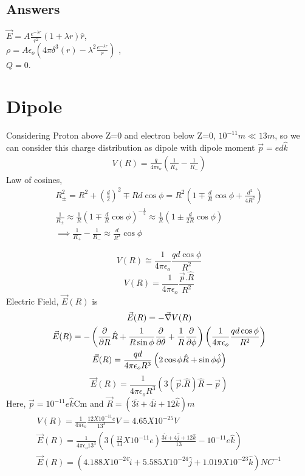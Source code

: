 \documentclass[11pt, a4paper]{article}
\begin{document}
\subsection*{Answers}
\(\boxed{\vec{E} = A \frac{e^{-\lambda r}}{r^2} (1 + \lambda r)\hat{r}}\), \\ \(\boxed{\rho = A\epsilon_o \left( 4 \pi \delta^3(r) -  \lambda^2\frac{e^{-\lambda r}}{r}\right)}\) ,\\\(
    \boxed{Q = 0}\).
\newpage
\section{Dipole}
Considering Proton above Z=0 and electron below Z=0, \(10^{-11}m \ll 13m  \), so we can consider this charge distribution as dipole with dipole moment \(\vec{p} = ed \hat{k} \) 
\begin{gather}
    V(R) = \frac{q}{4 \pi \epsilon_{o} }\left(\frac{1}{R_+}-\frac{1}{R_-}\right)
\end{gather}
Law of cosines, 
\begin{gather}
    R_\pm^2 = R^2 + (\frac{d}{2})^2 \mp Rd\cos \phi = R^2(1\mp \frac{d}{R}\cos\phi + \frac{d^2}{4 R^2})\\
    \frac{1}{R_\pm} \approx \frac{1}{R}\left(1\mp \frac{d}{R}\cos\phi\right)^{-\frac{1}{2}} \approx \frac{1}{R}\left(1\pm \frac{d}{2R}\cos\phi\right)\\
    \implies \frac{1}{R_+} - \frac{1}{R_-} \approx \frac{d}{
        R^2}\cos\phi
\end{gather}

\begin{equation}
    V(R) \cong \frac{1}{4\pi \epsilon_{o} } \frac{qd\cos\phi}{R^2}
\end{equation}
\begin{equation}
    \boxed{V(R) = \frac{1}{4\pi \epsilon_{o} } \frac{\vec{p}.\hat{R}}{R^2}}
\end{equation}
Electric Field, \(\vec{E}(R)\) is
\begin{gather}
    \vec{E}(R) = -\vec{\nabla}V(R)\\
    \vec{E}(R) = -\left(\pdv{}{R}\hat{R} +\frac{1}{R \sin \phi}\pdv{}{\theta}+\frac{1}{R}\pdv{}{\phi}\right)\left(\frac{1}{4\pi \epsilon_{o} }\frac{qd\cos\phi}{R^2}\right)\\
    \vec{E}(R) = \frac{qd}{4\pi \epsilon_{o} R^3} \left(2 \cos\phi \hat{R} + \sin \phi \hat{\phi}  \right)
\end{gather}
\begin{equation}
    \boxed{\vec{E}(R) = \frac{1}{4 \pi \epsilon_{o} R^3}\left(3(\vec{p}.\hat{R})\hat{R} -\vec{p} \right)}
\end{equation}
Here, \(\vec{p} = 10^{-11} e \hat{k} \)Cm  and \(\vec{R} = (3 \hat{i} + 4 \hat{i}+12 \hat{k})m \)  
\begin{gather}
    V(R) = \frac{1}{4\pi \epsilon_{o} } \frac{12 X 10^{-11} e }{13^3}V = 4.65 X 10^{-25} V  \\
    \vec{E} (R)= \frac{1}{4 \pi \epsilon_{o} 13^3}(3(\frac{12}{13}X10^{-11}e)\frac{3 \hat{i} + 4 \hat{j} +12 \hat{k} }{13} - 10^{-11}e \hat{k}   )\\
    \vec{E}(R) = (4.188X10^{-24}\hat{i}+ 5.585X10^{-24} \hat{j}+1.019 X 10^{-23} \hat{k} )NC^{-1}  
\end{gather}
\end{document}
